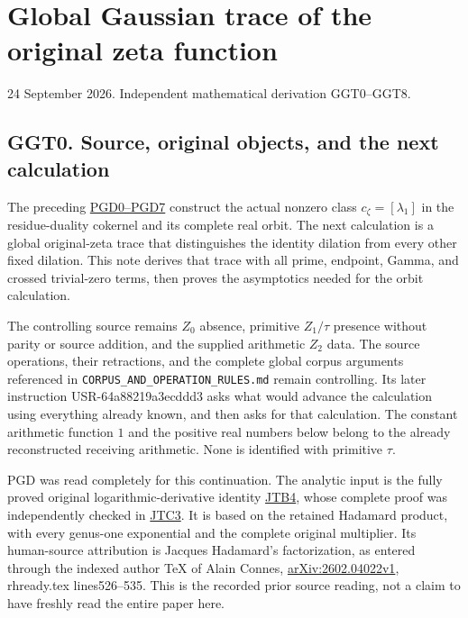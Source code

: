 \section{Global Gaussian trace of the original zeta
function}\label{global-gaussian-trace-of-the-original-zeta-function}

24 September 2026. Independent mathematical derivation GGT0--GGT8.

\subsection{GGT0. Source, original objects, and the next
calculation}\label{ggt0.-source-original-objects-and-the-next-calculation}

The preceding \href{GLOBAL_POLYNOMIAL_DUAL_DEFECT.md}{PGD0--PGD7}
construct the actual nonzero class \(c_\zeta=[\lambda_1]\) in the
residue-duality cokernel and its complete real orbit. The next
calculation is a global original-zeta trace that distinguishes the
identity dilation from every other fixed dilation. This note derives
that trace with all prime, endpoint, Gamma, and crossed trivial-zero
terms, then proves the asymptotics needed for the orbit calculation.

The controlling source remains \(Z_0\) absence, primitive \(Z_1/\tau\)
presence without parity or source addition, and the supplied arithmetic
\(Z_2\) data. The source operations, their retractions, and the complete
global corpus arguments referenced in \nolinkurl{CORPUS_AND_OPERATION_RULES.md}
remain controlling. Its later instruction USR-64a88219a3ecddd3 asks what
would advance the calculation using everything already known, and then
asks for that calculation. The constant arithmetic function \(1\) and
the positive real numbers below belong to the already reconstructed
receiving arithmetic. None is identified with primitive \(\tau\).

PGD was read completely for this continuation. The analytic input is the
fully proved original logarithmic-derivative identity
\href{ORIGINAL_ZETA_JACOBIAN_TRACE_BRIDGE.md}{JTB4}, whose complete
proof was independently checked in
\href{ORIGINAL_ZETA_JACOBIAN_TRACE_BRIDGE_INDEPENDENT_CHECK.md}{JTC3}.
It is based on the retained Hadamard product, with every genus-one
exponential and the complete original multiplier. Its human-source
attribution is Jacques Hadamard's factorization, as entered through the
indexed author TeX of Alain Connes,
\href{https://arxiv.org/abs/2602.04022v1}{arXiv:2602.04022v1},
rhready.tex lines526--535. This is the recorded prior source reading,
not a claim to have freshly read the entire paper here.

